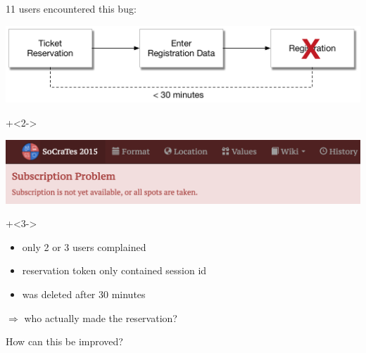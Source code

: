 \begin{frame}[fragile]{}

\renewcommand{\SPACE}{1em}

11 users encountered this bug:

\vspace{\SPACE}                 

\includegraphics[width=\textwidth]{../Registration5.pdf}

\vspace{\SPACE}                 

\onslide+<2->

\includegraphics[width=\textwidth]{../subscription_problem.png}

\onslide+<3->
                  
\vspace{\SPACE}                 
                  
\begin{itemize}
\item only 2 or 3 users complained
\item reservation token only contained session id
\item was deleted after 30 minutes
\end{itemize}
                  
$\Longrightarrow$ who actually made the reservation?
             
\end{frame}

\begin{frame}[fragile]{}

\begin{center}
\LARGE
How can this be improved?
\end{center}             
                  
\end{frame}

